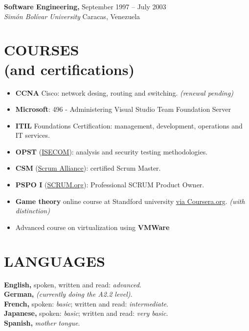 \documentclass[line,margin]{res}
\begin{document}
\begin{resume}
               \textbf{Software Engineering,} \hfill 
               September 1997 -- July 2003 \\
               \textit{Sim\'{o}n Bol\'{i}var University} \hfill Caracas, Venezuela

\section{COURSES \\ \footnotesize{(and certifications)}}
               \begin{itemize}  \itemsep 2pt %
               \item \textbf{CCNA} Cisco: network desing, routing and 
               switching. \textit{(renewal pending)}
               \item \textbf{Microsoft}: 496 - Administering Visual Studio Team Foundation Server 
               \item \textbf{ITIL} Foundations Certification: management, 
               development, operations and IT services.
               \item \textbf{OPST} (\href{http://www.isecom.org/certification/opst.html}{ISECOM}): analysis and security testing methodologies.
	    \item \textbf{CSM} (\href{https://www.scrumalliance.org/certifications/practitioners/certified-scrummaster-csm}{Scrum Alliance}): certified Scrum Master.
               \item \textbf{PSPO I} (\href{https://www.scrum.org/Assessments/Professional-Scrum-Product-Owner-Assessments}{SCRUM.org}): Professional SCRUM Product Owner.
	    \item \textbf{Game theory} online course at Standford university \href{https://www.coursera.org/course/gametheory}{via Coursera.org}. \textit{(with distinction)}
               \item Advanced course on virtualization using \textbf{VMWare} 
               \end{itemize}


\section{LANGUAGES} 
               \textbf{English,}
               spoken, written and read: \textit{advanced}.
               \\
               \textbf{German,}
               \textit{(currently doing the A2.2 level)}.
               \\
               \textbf{French,}
               spoken: \textit{basic}; written and read: 
               \textit{intermediate}.
               \\
               \textbf{Japanese,}
               spoken: \textit{basic}; written and read: 
               \textit{very basic}.
               \\
               \textbf{Spanish,}
               \textit{mother tongue}.


\end{resume}
\end{document}
